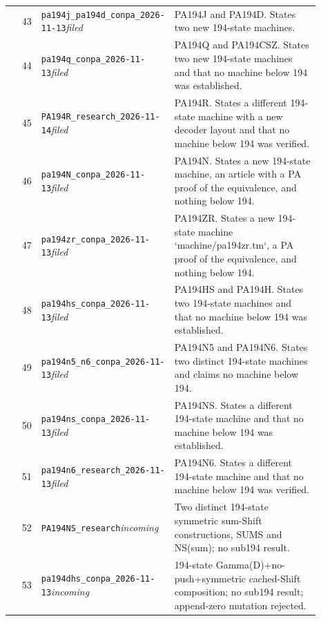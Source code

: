\begin{longtable}{@{}rp{0.42\linewidth}p{0.47\linewidth}@{}}
43 & \nolinkurl{pa194j_pa194d_conpa_2026-11-13}\newline\emph{filed} & PA194J and PA194D. States two new 194-state machines. \\[2pt]
44 & \nolinkurl{pa194q_conpa_2026-11-13}\newline\emph{filed} & PA194Q and PA194CSZ. States two new 194-state machines and that no machine below 194 was established. \\[2pt]
45 & \nolinkurl{PA194R_research_2026-11-14}\newline\emph{filed} & PA194R. States a different 194-state machine with a new decoder layout and that no machine below 194 was verified. \\[2pt]
46 & \nolinkurl{pa194N_conpa_2026-11-13}\newline\emph{filed} & PA194N. States a new 194-state machine, an article with a PA proof of the equivalence, and nothing below 194. \\[2pt]
47 & \nolinkurl{pa194zr_conpa_2026-11-13}\newline\emph{filed} & PA194ZR. States a new 194-state machine `machine/pa194zr.tm`, a PA proof of the equivalence, and nothing below 194. \\[2pt]
48 & \nolinkurl{pa194hs_conpa_2026-11-13}\newline\emph{filed} & PA194HS and PA194H. States two 194-state machines and that no machine below 194 was established. \\[2pt]
49 & \nolinkurl{pa194n5_n6_conpa_2026-11-13}\newline\emph{filed} & PA194N5 and PA194N6. States two distinct 194-state machines and claims no machine below 194. \\[2pt]
50 & \nolinkurl{pa194ns_conpa_2026-11-13}\newline\emph{filed} & PA194NS. States a different 194-state machine and that no machine below 194 was established. \\[2pt]
51 & \nolinkurl{pa194n6_research_2026-11-13}\newline\emph{filed} & PA194N6. States a different 194-state machine and that no machine below 194 was verified. \\[2pt]
52 & \nolinkurl{PA194NS_research}\newline\emph{incoming} & Two distinct 194-state symmetric sum-Shift constructions, SUMS and NS(sum); no sub194 result. \\[2pt]
53 & \nolinkurl{pa194dhs_conpa_2026-11-13}\newline\emph{incoming} & 194-state Gamma(D)+no-push+symmetric cached-Shift composition; no sub194 result; append-zero mutation rejected. \\[2pt]

\end{longtable}
